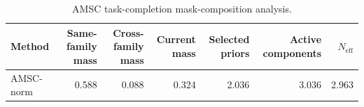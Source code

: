 \begin{table}[ht]
    \caption{AMSC task-completion mask-composition analysis.}
    \label{tbl:amsc_composition}
    \centering
    \scriptsize
    \begin{tabular}{lrrrrrr}
    \toprule
Method & Same-family mass & Cross-family mass & Current mass & Selected priors & Active components & $N_{\mathrm{eff}}$ \\
    \midrule
AMSC-norm & 0.588 & 0.088 & 0.324 & 2.036 & 3.036 & 2.963 \\
    \bottomrule
    \end{tabular}
\end{table}
